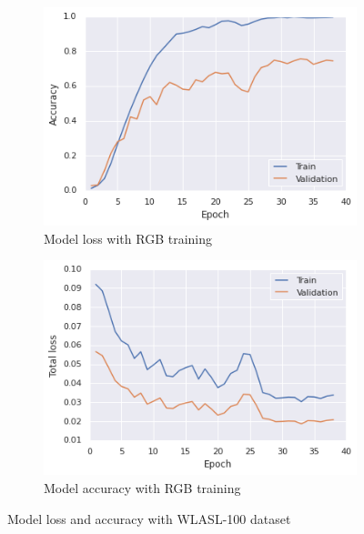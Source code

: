 \documentclass[a4paper, 12pt]{article}
\begin{document}
\begin{figure}[H]
    \centering
    \begin{subfigure}[b]{0.4\textwidth}
        \includegraphics[width=\textwidth]{result_on_wlasl_100_rgb.png}
        \caption{Model loss with RGB training             }
    \end{subfigure}
    \hfill
    \begin{subfigure}[b]{0.4\textwidth}
        \includegraphics[width=\textwidth]{result_on_wlasl_100_rgb_loss.png}
        \caption{Model accuracy with RGB training}
    \end{subfigure}
    \caption{Model loss and accuracy with WLASL-100 dataset}
    \label{Model training WLASL dataset, RGB-stream}
\end{figure}
\end{document}
